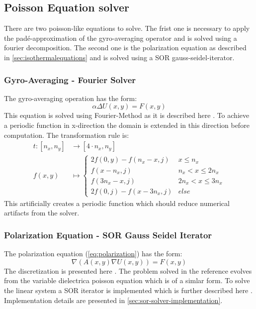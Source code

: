 \documentclass[master.tex]{subfiles}
\begin{document}
\subsection{Poisson Equation solver}
There are two poisson-like equations to solve. The frist one is necessary to apply the padé-approximation of the gyro-averaging operator and is solved using a fourier decomposition. The second one is the polarization equation as described in \autoref{sec:isothermalequations} and is solved using a \ac{SOR} gauss-seidel-iterator.

\subsubsection{Gyro-Averaging - Fourier Solver}
The gyro-averaging operation has the form:
\begin{equation}
    \alpha \Delta U(x, y) = F(x, y)
\end{equation}
This equation is solved using Fourier-Method as it is described here \cite{fft-poisson}. To achieve a periodic function in x-direction the domain is extended in this direction before computation. The transformation rule is:
\begin{equation}
\label{eq:gyro-transformation}
\begin{split}
    t\colon [n_x, n_y] & \to [4 \cdot n_x, n_y]\\
    f(x, y) &\mapsto \begin{cases}
    2 f(0, y) - f(n_x - x, j) & x \leq n_x\\
    f(x - n_x, j) & n_x < x \leq 2n_x\\
    f(3n_x-x,j) & 2n_x < x \leq 3n_x \\
    2 f(0, j) - f(x - 3n_x, j) & else
    \end{cases}
\end{split}
\end{equation}
This artificially creates a periodic function which should reduce numerical artifacts from the solver.

\subsubsection{Polarization Equation - \ac{SOR} Gauss Seidel Iterator} \label{sec:polarization-equation}
The polarization equation (\autoref{eq:polarization}) has the form:
\begin{equation}
    \nabla\left( A(x, y) \nabla U(x, y)\right) = F(x, y)
\end{equation}
The discretization is presented here \cite{DielectricPoisson}. The problem solved in the reference evolves from the variable dielectrica poisson equation which is of a simlar form. To solve the linear system a \ac{SOR} iterator is implemented which is further described here \cite{SORPaper}. Implementation details are presented in \autoref{sec:sor-solver-implementation}.
\end{document}
